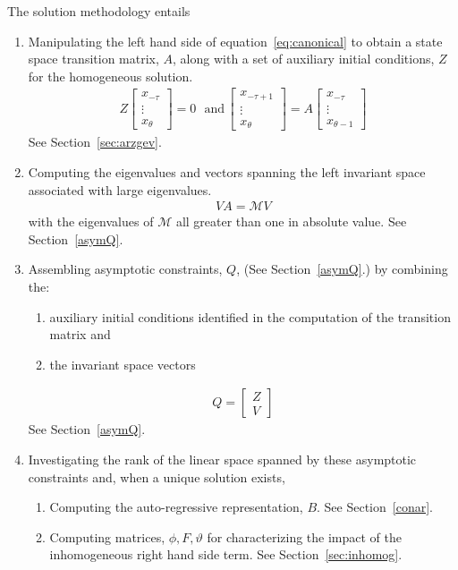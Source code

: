 \documentclass[12pt]{article}
\begin{document}
The solution methodology entails 
\begin{enumerate}
\item Manipulating the left hand side of equation~\ref{eq:canonical} to obtain
 a state space transition matrix, $A$, along with
a set of auxiliary initial conditions, $Z$ for the homogeneous solution.
\begin{gather}
  Z
  \begin{bmatrix}
    x_{-\tau}\\ \vdots \\ x_{\theta}
  \end{bmatrix}=0 \,\,\,\,\text{and}\,   \begin{bmatrix}
    x_{-\tau+1}\\ \vdots \\ x_{\theta}
  \end{bmatrix}
=A   \begin{bmatrix}
    x_{-\tau}\\ \vdots \\ x_{\theta-1}
  \end{bmatrix}
\end{gather}
See Section~\ref{sec:arzgev}.
\item Computing the eigenvalues and vectors spanning 
the left invariant space associated with
large eigenvalues. 
\begin{gather}
 V A =   \mathcal{M}  V 
\end{gather}
with the eigenvalues of $ \mathcal{M}$ all greater than one in absolute value.
See Section~\ref{asymQ}.
\item Assembling asymptotic
constraints, $Q$, (See Section~\ref{asymQ}.)  by combining the:
  \begin{enumerate}
\item  auxiliary initial conditions identified in the computation of the transition matrix and 
\item the invariant space vectors
  \end{enumerate}
\begin{gather}
  Q= 
  \begin{bmatrix}
    Z\\V
  \end{bmatrix}
\end{gather}
See Section~\ref{asymQ}.
\item Investigating the rank of the linear space spanned by these asymptotic
constraints and,  when a unique solution exists, 
\begin{enumerate}
\item Computing the auto-regressive 
representation, $B$. See Section~\ref{conar}.
\item Computing matrices, $\phi, F, \vartheta$ 
for characterizing the impact of the inhomogeneous
right hand side term. See Section~\ref{sec:inhomog}.

\end{enumerate}
\end{enumerate}
\end{document}
